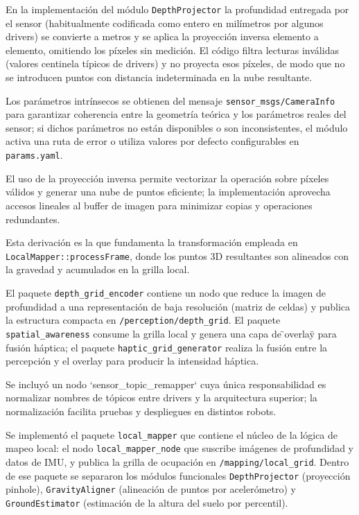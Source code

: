 En la implementación del módulo \texttt{DepthProjector} la profundidad entregada por el sensor (habitualmente codificada como entero en milímetros por algunos drivers) se convierte a metros y se aplica la proyección inversa elemento a elemento, omitiendo los píxeles sin medición. El código filtra lecturas inválidas (valores centinela típicos de drivers) y no proyecta esos píxeles, de modo que no se introducen puntos con distancia indeterminada en la nube resultante.

Los parámetros intrínsecos se obtienen del mensaje \texttt{sensor\_msgs/CameraInfo} para garantizar coherencia entre la geometría teórica y los parámetros reales del sensor; si dichos parámetros no están disponibles o son inconsistentes, el módulo activa una ruta de error o utiliza valores por defecto configurables en \texttt{params.yaml}.

El uso de la proyección inversa permite vectorizar la operación sobre píxeles válidos y generar una nube de puntos eficiente; la implementación aprovecha accesos lineales al buffer de imagen para minimizar copias y operaciones redundantes.

Esta derivación es la que fundamenta la transformación empleada en \texttt{LocalMapper::processFrame}, donde los puntos 3D resultantes son alineados con la gravedad y acumulados en la grilla local.

El paquete \texttt{depth\_grid\_encoder} contiene un nodo que reduce la imagen de profundidad a una representación de baja resolución (matriz de celdas) y publica la estructura compacta en \texttt{/perception/depth\_grid}. El paquete \texttt{spatial\_awareness} consume la grilla local y genera una capa de \"{}overlay\"{} para fusión háptica; el paquete \texttt{haptic\_grid\_generator} realiza la fusión entre la percepción y el overlay para producir la intensidad háptica.

Se incluyó un nodo `sensor\_topic\_remapper` cuya única responsabilidad es normalizar nombres de tópicos entre drivers y la arquitectura superior; la normalización facilita pruebas y despliegues en distintos robots.

Se implementó el paquete \texttt{local\_mapper} que contiene el núcleo de la lógica de mapeo local: el nodo \texttt{local\_mapper\_node} que suscribe imágenes de profundidad y datos de IMU, y publica la grilla de ocupación en \texttt{/mapping/local\_grid}. Dentro de ese paquete se separaron los módulos funcionales \texttt{DepthProjector} (proyección pinhole), \texttt{GravityAligner} (alineación de puntos por acelerómetro) y \texttt{GroundEstimator} (estimación de la altura del suelo por percentil).

